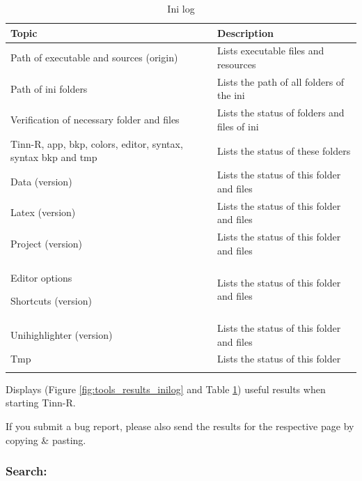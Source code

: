 \begin{table}
  \begin{footnotesize}
    \begin{tabularx}{\textwidth}{XX}\\
      \hline
      \textbf{Topic} & \textbf{Description} \\
      \hline
      Path of executable and sources (origin) & Lists executable files and resources \\
      Path of ini folders & Lists the path of all folders of the ini \\
      Verification of necessary folder and files & Lists the status of folders and files of ini \\
      Tinn-R, app, bkp, colors, editor, syntax, syntax bkp and tmp & Lists the status of these folders \\
      Data (version) & Lists the status of this folder and files \\
      Latex (version) & Lists the status of this folder and files \\
      Project (version) & Lists the status of this folder and files \\
      Editor options

      Shortcuts (version) & Lists the status of this folder and files \\
      Unihighlighter (version) & Lists the status of this folder and files \\
      Tmp & Lists the status of this folder \\
      \hline
      \\
    \end{tabularx}
  \end{footnotesize}
  \caption{Ini log}
  \label{tab:tools_results_inilog}
\end{table}


Displays
(Figure \ref{fig:tools_results_inilog} and
Table \ref{tab:tools_results_inilog})
useful results when starting Tinn-R.

If you submit a bug report, please also send the results for the
respective page by copying \& pasting.


\subsubsection{Search:}
\\

